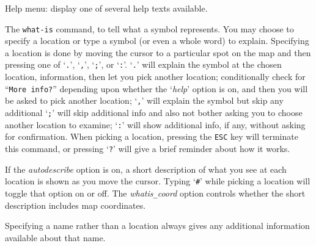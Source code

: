 \blist{}
\item[\tb{?}]
Help menu:  display one of several help texts available.
\item[\tb{/}]
The {\tt what-is} command, to
tell what a symbol represents.  You may choose to specify a location
or type a symbol (or even a whole word) to explain.
Specifying a location is done by moving the cursor to a particular spot
on the map and then pressing one of `{\tt .}', `{\tt ,}', `{\tt ;}',
or `{\tt :}'.  `{\tt .}' will explain the symbol at the chosen location,
information, then let you pick another location;
conditionally check for ``{\tt More info?}'' depending upon whether the
`{\it help\/}'
option is on, and then you will be asked to pick another location;
`{\tt ,}' will explain the symbol but skip any additional
`{\tt ;}' will skip additional info and also not bother asking
you to choose another location to examine; `{\tt :}' will show additional
info, if any, without asking for confirmation.  When picking a location,
pressing the {\tt ESC} key will terminate this command, or pressing `{\tt ?}'
will give a brief reminder about how it works.

If the
{\it autodescribe\/}
option is on, a short description of what you see at each location is
shown as you move the cursor.  Typing `{\tt \#}' while picking a location will
toggle that option on or off.
The
{\it whatis\verb+_+coord\/}
option controls whether the short description includes map coordinates.

Specifying a name rather than a location
always gives any additional information available about that name.

